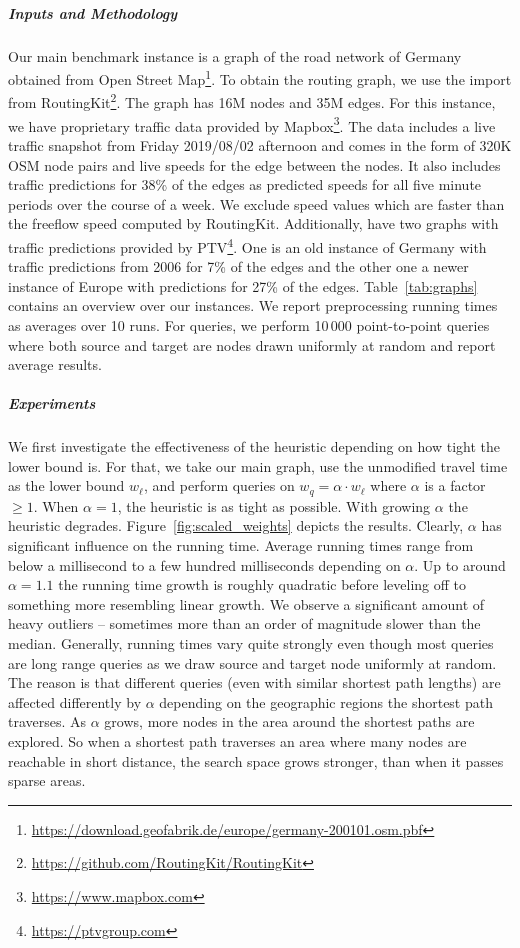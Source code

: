 \documentclass[letterpaper]{article} %
\begin{document}
\subparagraph{Inputs and Methodology}
Our main benchmark instance is a graph of the road network of Germany obtained from Open Street Map\footnote{\url{https://download.geofabrik.de/europe/germany-200101.osm.pbf}}.
To obtain the routing graph, we use the import from RoutingKit\footnote{\url{https://github.com/RoutingKit/RoutingKit}}.
The graph has 16M nodes and 35M edges.
For this instance, we have proprietary traffic data provided by Mapbox\footnote{\url{https://www.mapbox.com}}.
The  data includes a live traffic snapshot from Friday 2019/08/02 afternoon and comes in the form of 320K OSM node pairs and live speeds for the edge between the nodes.
It also includes traffic predictions for 38\% of the edges as predicted speeds for all five minute periods over the course of a week.
We exclude speed values which are faster than the freeflow speed computed by RoutingKit.
Additionally, have two graphs with traffic predictions provided by PTV\footnote{\url{https://ptvgroup.com}}.
One is an old instance of Germany with traffic predictions from 2006 for 7\% of the edges and the other one a newer instance of Europe with predictions for 27\% of the edges.
Table~\ref{tab:graphs} contains an overview over our instances.
We report preprocessing running times as averages over 10 runs.
For queries, we perform 10\,000 point-to-point queries where both source and target are nodes drawn uniformly at random and report average results.

\subparagraph{Experiments}
We first investigate the effectiveness of the heuristic depending on how tight the lower bound is.
For that, we take our main graph, use the unmodified travel time as the lower bound $w_\ell$, and perform queries on $w_q = \alpha \cdot w_\ell$ where $\alpha$ is a factor $\geq 1$.
When $\alpha = 1$, the heuristic is as tight as possible.
With growing $\alpha$ the heuristic degrades.
Figure~\ref{fig:scaled_weights} depicts the results.
Clearly, $\alpha$ has significant influence on the running time.
Average running times range from below a millisecond to a few hundred milliseconds depending on $\alpha$.
Up to around $\alpha = 1.1$ the running time growth is roughly quadratic before leveling off to something more resembling linear growth.
We observe a significant amount of heavy outliers -- sometimes more than an order of magnitude slower than the median.
Generally, running times vary quite strongly even though most queries are long range queries as we draw source and target node uniformly at random.
The reason is that different queries (even with similar shortest path lengths) are affected differently by $\alpha$ depending on the geographic regions the shortest path traverses.
As $\alpha$ grows, more nodes in the area around the shortest paths are explored.
So when a shortest path traverses an area where many nodes are reachable in short distance, the search space grows stronger, than when it passes sparse areas.
\end{document}
